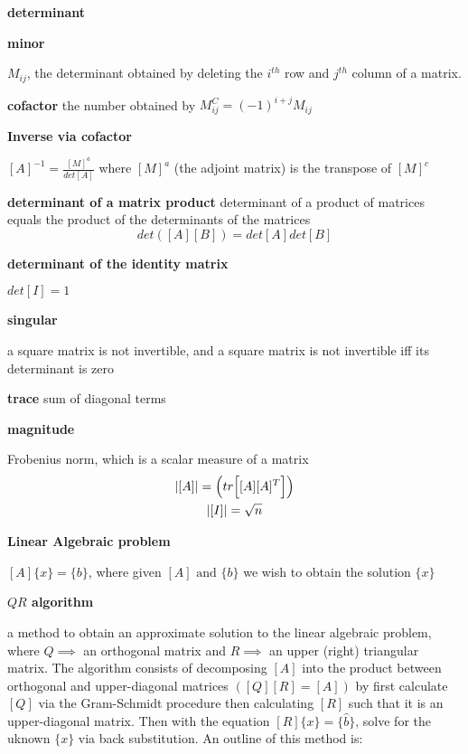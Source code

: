 \documentclass[letterpaper, 10pt, oneside]{article}
\newenvironment{dd}[1]{
	\noindent
	\textbf{\normalsize{#1}}
	\hspace{0.1in}
	\small
	\rmfamily
	}
	{\medskip}
\newcommand{\bdd}{\begin{dd}}
\newcommand{\edd}{\end{dd}}
\DeclarePairedDelimiter\abs{\lvert}{\rvert}%
\begin{document}
\begin{dd}{determinant}

\end{dd}

\begin{dd}{minor}
$M_{ij}$, the determinant obtained by deleting the $i^{th}$ row and $j^{th}$ column of a matrix.
\end{dd}

\begin{dd}{cofactor} the number obtained by
$M_{ij}^C = (-1)^{i+j}M_{ij}$
\end{dd}

\begin{dd}{Inverse via cofactor}
$[A]^{-1} = \frac{[M]^a}{det[A]}$ where $[M]^a$ (the adjoint matrix) is the transpose of $[M]^c$
\end{dd}

\begin{dd}{determinant of a matrix product} determinant of a product of matrices equals the product of the determinants of the matrices
$$det\left([A][B]\right) = det[A] det[B]$$
\end{dd}

\begin{dd}{determinant of the identity matrix}
$det[I]= 1$
\end{dd}

\begin{dd}{singular}
a square matrix is not invertible, and a square matrix is not invertible iff its determinant is zero
\end{dd}

\begin{dd}{trace} sum of diagonal terms

\end{dd}

\begin{dd}{magnitude}
Frobenius norm, which is a scalar measure of a matrix
\begin{gather*}
	\abs{[A]} = \left(tr\Big[ [A] [A]^T \Big] \right)\\
	\abs{[I]} = \sqrt{n} 
\end{gather*}
\end{dd}

\bdd{Linear Algebraic problem}
$[A]\{x\}=\{b\}$, where given $[A] \text{ and } \{b\}$ we wish to obtain the solution $\{x\}$
\edd

\bdd{$QR$ algorithm}
a method to obtain an approximate solution to the linear algebraic problem, where $Q\implies$ an orthogonal matrix and $R\implies$ an upper (right) triangular matrix.  The algorithm consists of decomposing $[A]$ into the product between orthogonal and upper-diagonal matrices $([Q][R]=[A])$ by first calculate $[Q]$ via the Gram-Schmidt procedure then calculating $[R]$ such that it is an upper-diagonal matrix.  Then with the equation $[R]\{x\} = \{\hat{b}\}$, solve for the uknown $\{x\}$ via back substitution.  An outline of this method is:
\end{document}
